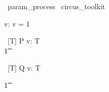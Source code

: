 
\begin{zsection}
  \SECTION\ param\_process \parents\ circus\_toolkit
\end{zsection}

\begin{axdef}
   v: \nat
\where
   v = 1
\end{axdef}

\begin{circus}
    \circprocess\ [T] P \circdef  v:  T \circspot \circbegin  \\
    \t1 \circspot \Skip \\
    \circend
\end{circus}


\begin{circus}
    \circprocess\ [T] Q \circdef  v:  T \circspot \circbegin
\end{circus}

\begin{circusaction}
   \t1 \circspot \Stop
\end{circusaction}

\begin{circus}
   \circend
\end{circus}
